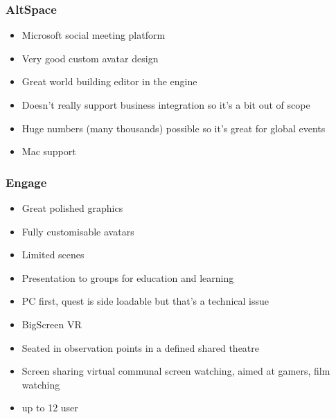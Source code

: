 \subsubsection{AltSpace}
\begin{itemize}
\item Microsoft social meeting platform
\item Very good custom avatar design
\item Great world building editor in the engine
\item Doesn't really support business integration so it's a bit out of scope
\item Huge numbers (many thousands) possible so it's great for global events
\item Mac support
\end{itemize}
\subsubsection{Engage}
\begin{itemize}
\item Great polished graphics
\item Fully customisable avatars
\item Limited scenes
\item Presentation to groups for education and learning
\item PC first, quest is side loadable but that's a technical issue
\item BigScreen VR
\item Seated in observation points in a defined shared theatre
\item Screen sharing virtual communal screen watching, aimed at gamers, film watching
\item up to 12 user
\end{itemize}

